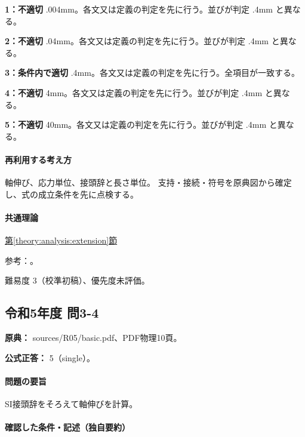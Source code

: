 \noindent\textbf{1：不適切} .004mm。各文又は定義の判定を先に行う。並びが判定 .4mm と異なる。\par

\noindent\textbf{2：不適切} .04mm。各文又は定義の判定を先に行う。並びが判定 .4mm と異なる。\par

\noindent\textbf{3：条件内で適切} .4mm。各文又は定義の判定を先に行う。全項目が一致する。\par

\noindent\textbf{4：不適切} 4mm。各文又は定義の判定を先に行う。並びが判定 .4mm と異なる。\par

\noindent\textbf{5：不適切} 40mm。各文又は定義の判定を先に行う。並びが判定 .4mm と異なる。\par

\paragraph{再利用する考え方} 軸伸び、応力単位、接頭辞と長さ単位。 支持・接続・符号を原典図から確定し、式の成立条件を先に点検する。

\paragraph{共通理論} \hyperref[theory:analysis:extension]{第\ref*{theory:analysis:extension}節}

\par 参考：\cite{mit_material_elastic2000}。

\par 難易度 3（校準初稿）、優先度未評価。

\subsection{令和5年度 問3-4}
\label{q:r05-reg-basic-3-4}

\noindent\textbf{原典：} sources/R05/basic.pdf、PDF物理10頁。

\textbf{公式正答：} 5（single）。

\paragraph{問題の要旨} SI接頭辞をそろえて軸伸びを計算。

\paragraph{確認した条件・記述（独自要約）}\mbox{}\par

